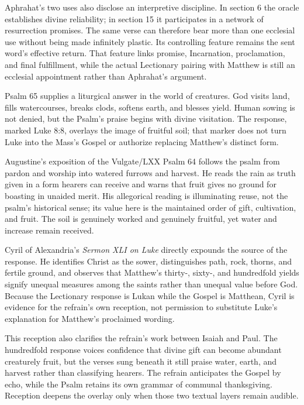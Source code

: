 \begin{deepstudy}
Aphrahat's two uses also disclose an interpretive discipline. In section 6 the oracle establishes divine reliability; in section 15 it participates in a network of resurrection promises. The same verse can therefore bear more than one ecclesial use without being made infinitely plastic. Its controlling feature remains the sent word's effective return. That feature links promise, Incarnation, proclamation, and final fulfillment, while the actual Lectionary pairing with Matthew is still an ecclesial appointment rather than Aphrahat's argument.

Psalm 65 supplies a liturgical answer in the world of creatures. God visits land, fills watercourses, breaks clods, softens earth, and blesses yield. Human sowing is not denied, but the Psalm's praise begins with divine visitation. The response, marked Luke 8:8, overlays the image of fruitful soil; that marker does not turn Luke into the Mass's Gospel or authorize replacing Matthew's distinct form.

Augustine's exposition of the Vulgate/LXX Psalm 64 follows the psalm from pardon and worship into watered furrows and harvest. He reads the rain as truth given in a form hearers can receive and warns that fruit gives no ground for boasting in unaided merit. His allegorical reading is illuminating reuse, not the psalm's historical sense; its value here is the maintained order of gift, cultivation, and fruit. The soil is genuinely worked and genuinely fruitful, yet water and increase remain received.

Cyril of Alexandria's \emph{Sermon XLI on Luke} directly expounds the source of the response. He identifies Christ as the sower, distinguishes path, rock, thorns, and fertile ground, and observes that Matthew's thirty-, sixty-, and hundredfold yields signify unequal measures among the saints rather than unequal value before God. Because the Lectionary response is Lukan while the Gospel is Matthean, Cyril is evidence for the refrain's own reception, not permission to substitute Luke's explanation for Matthew's proclaimed wording.

This reception also clarifies the refrain's work between Isaiah and Paul. The hundredfold response voices confidence that divine gift can become abundant creaturely fruit, but the verses sung beneath it still praise water, earth, and harvest rather than classifying hearers. The refrain anticipates the Gospel by echo, while the Psalm retains its own grammar of communal thanksgiving. Reception deepens the overlay only when those two textual layers remain audible.


\end{deepstudy}
